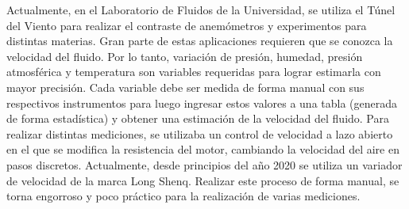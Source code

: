 Actualmente, en el Laboratorio de Fluidos de la Universidad, se utiliza el Túnel del Viento para realizar el contraste de anemómetros y experimentos para distintas materias. Gran parte de estas aplicaciones requieren que se conozca la velocidad del fluido. Por lo tanto, variación de presión, humedad, presión atmosférica y temperatura son variables requeridas para lograr estimarla con mayor precisión.
Cada variable debe ser medida de forma manual con sus respectivos instrumentos para luego ingresar estos valores a una tabla (generada de forma estadística) y obtener una estimación de la velocidad del fluido.
Para realizar distintas mediciones, se utilizaba un control de velocidad a lazo abierto en el que se modifica la resistencia del motor, cambiando la velocidad del aire en pasos discretos. Actualmente, desde principios del año 2020 se utiliza un variador de velocidad de la marca Long Shenq.
Realizar este proceso de forma manual, se torna engorroso y poco práctico para la realización de varias mediciones.

\newpage